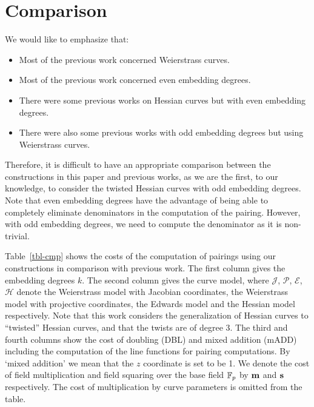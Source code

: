 \section{Comparison}
\label{sec:cmp}

We would like to emphasize that:
\begin{itemize}
\item	Most of the previous work concerned Weierstrass curves.
\item	Most of the previous work concerned even embedding degrees.
\item	There were some previous works on Hessian curves but with even embedding degrees.
\item	There were also some previous works with odd embedding degrees but using Weierstrass curves.
\end{itemize}
Therefore, it is difficult to have an appropriate comparison between the constructions in this paper and previous works,
as we are the first, to our knowledge, to consider the twisted Hessian curves with odd embedding degrees.
Note that even embedding degrees have the advantage of being able to completely eliminate denominators in the computation of the pairing.
However, with odd embedding degrees, we need to compute the denominator as it is non-trivial.

Table~\ref{tbl-cmp} shows the costs of the computation of pairings using our constructions in comparison with previous work.
The first column gives the embedding degrees $k$.
The second column gives the curve model, where 
$\mathcal{J}$, $\mathcal{P}$, $\mathcal{E}$, $\mathcal{H}$ denote the
Weierstrass model with Jacobian coordinates, the
Weierstrass model with projective coordinates,
the Edwards model and the
Hessian model respectively.
Note that this work considers the generalization of Hessian curves to ``twisted'' Hessian curves, and that the twists are of degree 3.
The third and fourth columns show the cost of doubling (DBL) and mixed addition (mADD) including the computation of the line functions for pairing computations.
By `mixed addition' we mean that the $z$ coordinate is set to be 1.
We denote the cost of field multiplication and field squaring over the base field $\mathbb{F}_{p}$ by $\textbf{m}$ and $\textbf{s}$ respectively.
The cost of multiplication by curve parameters is omitted from the table.

